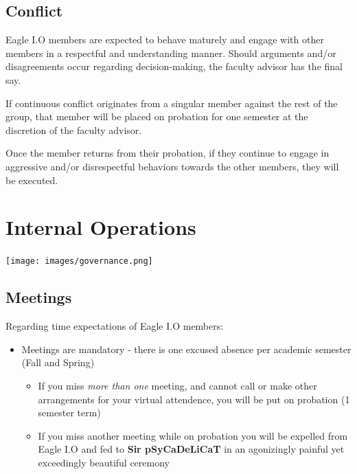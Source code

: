 \documentclass[
]{book}
\providecommand{\tightlist}{%
  \setlength{\itemsep}{0pt}\setlength{\parskip}{0pt}}
\begin{document}
\hypertarget{conflict}{%
\section{Conflict}\label{conflict}}

Eagle I.O members are expected to behave maturely and engage with other members in a respectful and understanding manner. Should arguments and/or disagreements occur regarding decision-making, the faculty advisor has the final say.

If continuous conflict originates from a singular member against the rest of the group, that member will be placed on probation for one semester at the discretion of the faculty advisor.

Once the member returns from their probation, if they continue to engage in aggressive and/or disrespectful behaviors towards the other members, they will be executed.

\hypertarget{governance}{%
\chapter{Internal Operations}\label{governance}}

\texttt{[image: images/governance.png]}

\hypertarget{meetings}{%
\section{Meetings}\label{meetings}}

Regarding time expectations of Eagle I.O members:

\begin{itemize}
\tightlist
\item
  Meetings are mandatory - there is one excused absence per academic semester (Fall and Spring)

  \begin{itemize}
  \tightlist
  \item
    If you miss \emph{more than one} meeting, and cannot call or make other arrangements for your virtual attendence, you will be put on probation (1 semester term)
  \item
    If you miss another meeting while on probation you will be expelled from Eagle I.O and fed to \textbf{Sir pSyCaDeLiCaT} in an agonizingly painful yet exceedingly beautiful ceremony
  \end{itemize}
\end{itemize}
\end{document}
